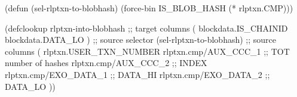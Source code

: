 (defun (sel-rlptxn-to-blobhash) (force-bin IS_BLOB_HASH (* rlptxn.CMP)))

(defclookup
  rlptxn-into-blobhash
  ;; target columns
  (
    blockdata.IS_CHAINID
    blockdata.DATA_LO
  )
  ;; source selector
  (sel-rlptxn-to-blobhash)
  ;; source columns
  (
    rlptxn.USER_TXN_NUMBER
    rlptxn.cmp/AUX_CCC_1 ;; TOT number of hashes
    rlptxn.cmp/AUX_CCC_2 ;; INDEX
    rlptxn.cmp/EXO_DATA_1 ;; DATA_HI
    rlptxn.cmp/EXO_DATA_2 ;; DATA_LO
  ))
